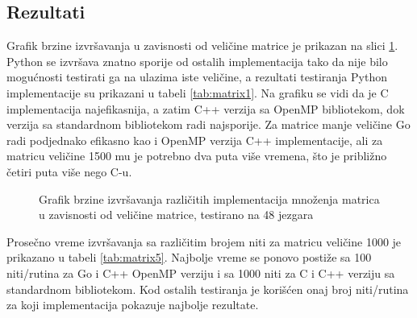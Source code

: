 \documentclass[12pt,oneside]{memoir}
\begin{document}
\subsection{Rezultati}

Grafik brzine izvršavanja u zavisnosti od veličine matrice je prikazan na slici \ref{fig:matrix1}. Python se izvršava znatno sporije od ostalih implementacija tako da nije bilo mogućnosti testirati ga na ulazima iste veličine, a rezultati testiranja Python implementacije su prikazani u tabeli \ref{tab:matrix1}. Na grafiku se vidi da je C implementacija najefikasnija, a zatim C++ verzija sa OpenMP bibliotekom, dok verzija sa standardnom bibliotekom radi najsporije. Za matrice manje veličine Go radi podjednako efikasno kao i OpenMP verzija C++ implementacije, ali za matricu veličine 1500 mu je potrebno dva puta više vremena, što je približno četiri puta više nego C-u. 

\begin{figure}
\begin{center}


\caption{Grafik brzine izvršavanja različitih implementacija množenja matrica u zavisnosti od veličine matrice, testirano na 48 jezgara}
\label{fig:matrix1}
\end{center}
\end{figure}


Prosečno vreme izvršavanja sa različitim brojem niti za matricu veličine 1000 je prikazano u tabeli \ref{tab:matrix5}. Najbolje vreme se ponovo postiže sa 100 niti/rutina za Go i C++ OpenMP verziju i sa 1000 niti za C i C++ verziju sa standardnom bibliotekom. Kod ostalih testiranja je korišćen onaj broj niti/rutina za koji implementacija pokazuje najbolje rezultate. 
\end{document}
